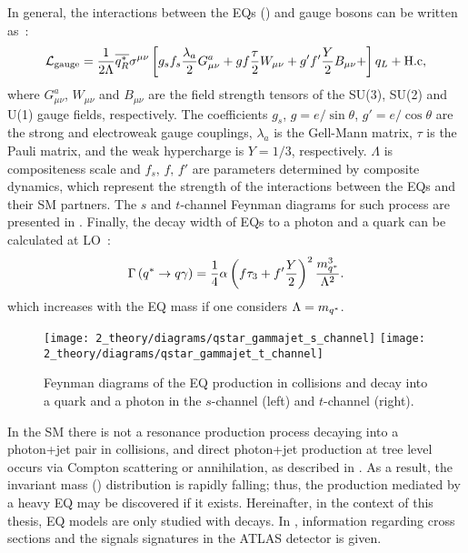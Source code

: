 In general, the interactions between the \acp{EQ} (\qstar) and gauge bosons can be written as~\cite{Zhan_Li_Liu_Li-2016}:
\begin{equation}
    \mathcal{L}_{\text{gauge}} = 
    \frac{1}{2\Lambda}
    \overline{q^{*}_R}
    \sigma^{\mu\nu}
    \left[
        g_s f_s \frac{\lambda_a}{2} G_{\mu\nu}^a +
        g f \frac{\tau}{2} W_{\mu\nu} +
        g' f' \frac{Y}{2} B_{\mu\nu} +
    \right]
    q_L
    + \text{H.c},
\end{equation}
where \(G_{\mu\nu}^a\), \(W_{\mu\nu}\) and \(B_{\mu\nu}\) are the field strength tensors of the SU(3), SU(2) and U(1) gauge fields, respectively. The coefficients \(g_s\), \(g = e / \sin \theta\), \(g' = e / \cos \theta\) are the strong and electroweak gauge couplings, \(\lambda_a\) is the Gell-Mann matrix, \(\tau\) is the Pauli matrix, and the weak hypercharge is \(Y = 1/3\), respectively. \(\Lambda\) is compositeness scale and \(f_s, \, f, \, f'\) are parameters determined by composite dynamics, which represent the strength of the interactions between the \acp{EQ} and their \ac{SM} partners. The \(s\) and \(t\)-channel Feynman diagrams for such process are presented in \Fig{\ref{fig:theory:bsm:diagrams}}. Finally, the decay width of \acp{EQ} to a photon and a quark can be calculated at \ac{LO}~\cite{Zhan_Li_Liu_Li-2016}:
\begin{equation}
    \Gamma\left(q^{*} \rightarrow q \gamma\right) =
    \frac{1}{4}
    \alpha
    \left(f \tau_3 + f' \frac{Y}{2}\right)^2
    \frac{m_{q^*}^3}{\Lambda^2}.
\end{equation}
which increases with the \ac{EQ} mass \mq if one considers \(\Lambda = m_{q^*}\).


\begin{figure}[ht!]
    \centering
    \texttt{[image: 2\_theory/diagrams/qstar\_gammajet\_s\_channel]}
    \hspace{1cm}
    \texttt{[image: 2\_theory/diagrams/qstar\_gammajet\_t\_channel]}
    \caption{Feynman diagrams of the \ac{EQ} production in \pp collisions and decay into a quark and a photon in the \(s\)-channel (left) and \(t\)-channel (right).}
    \label{fig:theory:bsm:diagrams}
\end{figure}


In the \ac{SM} there is not a resonance production process decaying into a photon+jet pair in \pp collisions, and direct photon+jet production at tree level occurs via Compton scattering or \qqbar annihilation, as described in \Sect{\ref{subsec:theory:sm:prompt_photon}}. As a result, the \gammajet invariant mass (\myj) distribution is rapidly falling; thus, the \gammajet production mediated by a heavy \ac{EQ} may be discovered if it exists. Hereinafter, in the context of this thesis, \ac{EQ} models are only studied with \gammajet decays. In , information regarding cross sections and the signals signatures in the \ac{ATLAS} detector is given.

